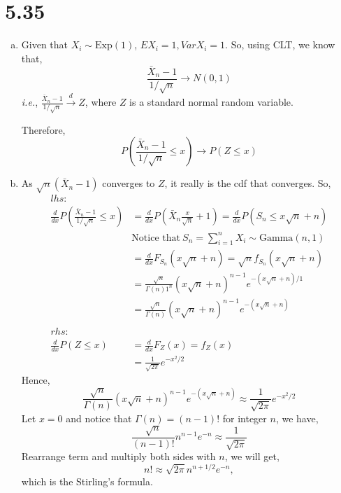 \documentclass[letterpaper]{article}
\begin{document}
\section*{5.35}
\begin{enumerate}[(a)]
\item Given that $X_i \sim \text{Exp}(1)$, $EX_i = 1, VarX_i = 1$. So, using CLT, we know that,
\[
\frac{\bar X_n -1}{1/\sqrt{n}} \to N(0, 1)
\]
\emph{i.e.}, $\frac{\bar X_n -1}{1/\sqrt{n}} \stackrel{d}{\to} Z$, where $Z$ is a standard normal random variable.

Therefore,
\[
P(\frac{\bar X_n -1}{1/\sqrt{n}} \le x) \to P(Z \le x)
\]
\item 
As $\sqrt{n}(\bar X_n - 1)$ converges to $Z$, it really is the cdf that converges. So,
\begin{align*}
lhs: & \\
\frac{d}{dx} P(\frac{\bar X_n - 1}{1/\sqrt{n}} \le x) & = \frac{d}{dx}P(\bar X_n \frac{x}{\sqrt{n}}+1) = \frac{d}{dx} P(S_n \le x\sqrt{n} + n)\\
& \text{Notice that}~S_n = \sum_{i=1}^n X_i \sim \text{Gamma}(n, 1)\\
& = \frac{d}{dx} F_{S_n}(x\sqrt{n} + n) = \sqrt{n} f_{S_n}(x\sqrt{n}+n) \\
& = \frac{\sqrt{n}}{\Gamma(n)1^n} (x\sqrt{n}+n)^{n-1} e^{-(x\sqrt{n}+n)/1} \\
& = \frac{\sqrt{n}}{\Gamma(n)} (x\sqrt{n}+n)^{n-1} e^{-(x\sqrt{n}+n)}\\
\\
rhs: & \\
\frac{d}{dx} P(Z \le x) & = \frac{d}{dx} F_Z(x) = f_Z(x) \\
& = \frac{1}{\sqrt{2\pi}} e^{-x^2/2}
\end{align*}
Hence, 
\[
\frac{\sqrt{n}}{\Gamma(n)} (x\sqrt{n}+n)^{n-1} e^{-(x\sqrt{n}+n)} \approx \frac{1}{\sqrt{2\pi}} e^{-x^2/2}
\]
Let $x = 0$ and notice that $\Gamma(n) = (n-1)!$ for integer $n$, we have,
\[
\frac{\sqrt{n}}{(n-1)!} n^{n-1} e^{-n} \approx \frac{1}{\sqrt{2\pi}}
\]
Rearrange term and multiply both sides with $n$, we will get,
\[
n! \approx \sqrt{2\pi} n^{n+1/2} e^{-n},
\]
which is the Stirling's formula.
\end{enumerate}
\end{document}
